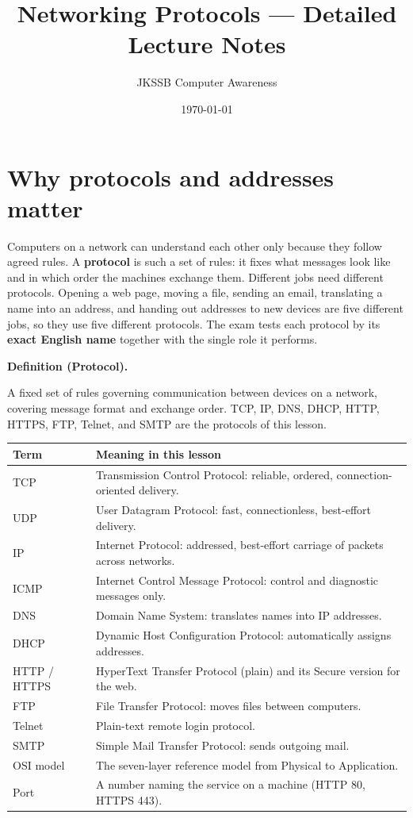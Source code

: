 \documentclass[11pt]{article}
\title{Networking Protocols --- Detailed Lecture Notes}
\author{JKSSB Computer Awareness}
\date{\today}
\newenvironment{definitionbox}[1]{%
  \par\noindent\textbf{Definition (#1).}\ \itshape
}{\par\vspace{0.3em}}
\begin{document}
\maketitle

\section{Why protocols and addresses matter}
Computers on a network can understand each other only because they follow
agreed rules. A \textbf{protocol} is such a set of rules: it fixes what
messages look like and in which order the machines exchange them. Different
jobs need different protocols. Opening a web page, moving a file, sending an
email, translating a name into an address, and handing out addresses to new
devices are five different jobs, so they use five different protocols. The
exam tests each protocol by its \textbf{exact English name} together with the
single role it performs.

\begin{definitionbox}{Protocol}
A fixed set of rules governing communication between devices on a network,
covering message format and exchange order. TCP, IP, DNS, DHCP, HTTP, HTTPS,
FTP, Telnet, and SMTP are the protocols of this lesson.
\end{definitionbox}

\begin{center}
\begin{tabular}{p{}p{}}
\toprule
\textbf{Term} & \textbf{Meaning in this lesson} \\
\midrule
TCP & Transmission Control Protocol: reliable, ordered, connection-oriented delivery. \\
UDP & User Datagram Protocol: fast, connectionless, best-effort delivery. \\
IP & Internet Protocol: addressed, best-effort carriage of packets across networks. \\
ICMP & Internet Control Message Protocol: control and diagnostic messages only. \\
DNS & Domain Name System: translates names into IP addresses. \\
DHCP & Dynamic Host Configuration Protocol: automatically assigns addresses. \\
HTTP / HTTPS & HyperText Transfer Protocol (plain) and its Secure version for the web. \\
FTP & File Transfer Protocol: moves files between computers. \\
Telnet & Plain-text remote login protocol. \\
SMTP & Simple Mail Transfer Protocol: sends outgoing mail. \\
OSI model & The seven-layer reference model from Physical to Application. \\
Port & A number naming the service on a machine (HTTP 80, HTTPS 443). \\
\bottomrule
\end{tabular}
\end{center}
\end{document}
